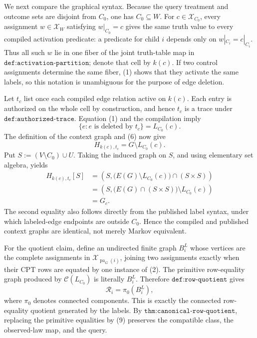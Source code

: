 We next compare the graphical syntax.  Because the query treatment and outcome sets are disjoint from \(C_0\), one has \(C_0\subseteq W\).  For \(c\in\mathcal X_{C_0}\), every assignment \(w\in\mathcal X_W\) satisfying \(w|_{C_0}=c\) gives the same truth value to every compiled activation predicate: a predicate for child \(i\) depends only on \(w|_{C_i}=c|_{C_i}\).  Thus all such \(w\) lie in one fiber of the joint truth-table map in \(\texttt{def:activation-partition}\); denote that cell by \(k(c)\).  If two control assignments determine the same fiber, (1) shows that they activate the same labels, so this notation is unambiguous for the purpose of edge deletion.

Let \(t_c\) list once each compiled edge relation active on \(k(c)\).  Each entry is authorized on the whole cell by construction, and hence \(t_c\) is a trace under \(\texttt{def:authorized-trace}\).  Equation (1) and the compilation imply
\[
\{e:e\text{ is deleted by }t_c\}=L_{C_0}(c).
\tag{6}
\]
The definition of the context graph and (6) now give
\[
H_{k(c),t_c}=G\setminus L_{C_0}(c).
\tag{7}
\]
Put \(S:=(V\setminus C_0)\cup U\).  Taking the induced graph on \(S\), and using elementary set algebra, yields
\[
\begin{aligned}
H_{k(c),t_c}[S]
&=\left(S,\bigl(E(G)\setminus L_{C_0}(c)\bigr)\cap(S\times S)\right)\\
&=\left(S,\bigl(E(G)\cap(S\times S)\bigr)\setminus L_{C_0}(c)\right)\\
&=G_c.
\end{aligned}
\tag{8}
\]
The second equality also follows directly from the published label syntax, under which labeled-edge endpoints are outside \(C_0\).  Hence the compiled and published context graphs are identical, not merely Markov equivalent.

For the quotient claim, define an undirected finite graph \(B_i^L\) whose vertices are the complete assignments in \(\mathcal X_{\operatorname{pa}_G(i)}\), joining two assignments exactly when their CPT rows are equated by one instance of (2).  The primitive row-equality graph produced by \(\mathcal C(L_{C_0})\) is literally \(B_i^L\).  Therefore \(\texttt{def:row-quotient}\) gives
\[
\mathcal R_i=\pi_0(B_i^L),
\tag{9}
\]
where \(\pi_0\) denotes connected components.  This is exactly the connected row-equality quotient generated by the labels.  By \(\texttt{thm:canonical-row-quotient}\), replacing the primitive equalities by (9) preserves the compatible class, the observed-law map, and the query.

